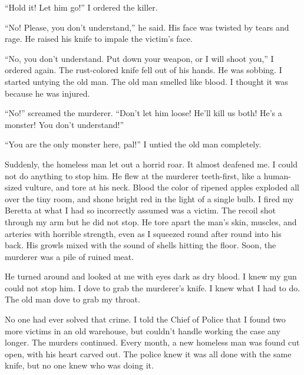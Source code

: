 ``Hold it! Let him go!'' I ordered the killer.



``No! Please, you don't understand,'' he said. His
face was twisted by tears and rage. He raised his knife to impale
the victim's face.



``No, you don't understand. Put down your weapon, or I
will shoot you,'' I ordered again. The rust-colored knife fell
out of his hands. He was sobbing. I started untying the old man.
The old man smelled like blood. I thought it was because he was
injured.



``No!'' screamed the murderer. ``Don't let him
loose! He'll kill us both! He's a monster! You
don't understand!''



``You are the only monster here, pal!'' I untied the old
man completely.



Suddenly, the homeless man let out a horrid roar. It almost
deafened me. I could not do anything to stop him. He flew at the
murderer teeth-first, like a human-sized vulture, and tore at his
neck. Blood the color of ripened apples exploded all over the tiny
room, and shone bright red in the light of a single bulb. I fired
my Beretta at what I had so incorrectly assumed was a victim. The
recoil shot through my arm but he did not stop. He tore apart the
man's skin, muscles, and arteries with horrible strength,
even as I squeezed round after round into his back. His growls
mixed with the sound of shells hitting the floor. Soon, the
murderer was a pile of ruined meat.



He turned around and looked at me with eyes dark as dry blood. I
knew my gun could not stop him. I dove to grab the murderer's
knife. I knew what I had to do. The old man dove to grab my
throat.



No one had ever solved that crime. I told the Chief of Police that
I found two more victims in an old warehouse, but couldn't
handle working the case any longer. The murders continued. Every
month, a new homeless man was found cut open, with his heart carved
out. The police knew it was all done with the same knife, but no
one knew who was doing it. 
 



%
%
%
%
%
%
%
%
% 
%
%
%

